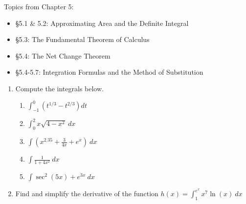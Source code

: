 \documentclass[11pt,fleqn]{article}
\def\ds{\displaystyle}
\begin{document}
\vspace*{-0.7in}

\begin{center}
  \Large{}
  \end{center}
  

Topics from Chapter 5: 
	\begin{itemize}
	\item \S 5.1 \& 5.2: Approximating Area and the Definite Integral
	\item \S 5.3: The Fundamental Theorem of Calculus
	\item \S 5.4: The Net Change Theorem
	\item \S 5.4-5.7: Integration Formulas and the Method of Substitution
	\end{itemize} 
\begin{enumerate}	


\item Compute the integrals below.
	\begin{enumerate}
	\item $\ds \int_{-1}^0 (t^{1/3} -t^{2/3}) dt$
	\vfill
	\item $\ds \int_0^2 x \sqrt{4-x^2} \: dx$
	\vfill\item $\ds \int (x^{2.35}+\frac{3}{4x}+e^x) \: dx$
	\vfill
	\item $\ds \int \frac{1}{1+4x^2} \: dx$
	\vfill
	\item $\ds \int \sec^2(5x)+e^{3x} \: dx$
	\vfill
	\end{enumerate}
\vfill
\newpage
\item Find and simplify the derivative of the function $\ds{h(x)=\int_1^{e^x} x^7\ln(x) \: dx}$\\
\vfill


\end{enumerate}
\end{document}
